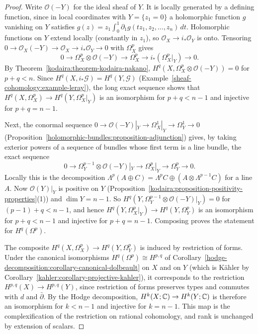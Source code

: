 \begin{proof}
Write $\mathcal{O}(-Y)$ for the ideal sheaf of $Y$. It is locally generated by a defining function, since in local coordinates with
$Y = \{z_1 = 0\}$ a holomorphic function $g$ vanishing on $Y$ satisfies $g(z) = z_1\int_0^1\partial_1g(tz_1, z_2, \ldots, z_n)\,dt$. Holomorphic
functions on $Y$ extend locally (constantly in $z_1$), so $\mathcal{O}_X \to i_*\mathcal{O}_Y$ is onto. Tensoring $0 \to \mathcal{O}_X(-Y) \to \mathcal{O}_X \to i_*\mathcal{O}_Y \to 0$ with $\Omega^p_X$ gives
\[
0 \to \Omega^p_X \otimes \mathcal{O}(-Y) \to \Omega^p_X \to i_*(\Omega^p_X|_Y) \to 0 .
\]
By Theorem~\ref{kodaira:theorem-kodaira-nakano}, $H^q(X, \Omega^p_X \otimes \mathcal{O}(-Y)) = 0$ for $p + q < n$. Since
$H^q(X, i_*\mathcal{G}) = H^q(Y, \mathcal{G})$ (Example~\ref{sheaf-cohomology:example-leray}), the long exact sequence shows that
$H^q(X, \Omega^p_X) \to H^q(Y, \Omega^p_X|_Y)$ is an isomorphism for $p + q < n - 1$ and injective for $p + q = n - 1$.

Next, the conormal sequence $0 \to \mathcal{O}(-Y)|_Y \to \Omega^1_X|_Y \to \Omega^1_Y \to 0$
(Proposition~\ref{holomorphic-bundles:proposition-adjunction}) gives, by taking exterior powers of a sequence of bundles whose first term is a
line bundle, the exact sequence
\[
0 \to \Omega^{p-1}_Y \otimes \mathcal{O}(-Y)|_Y \to \Omega^p_X|_Y \to \Omega^p_Y \to 0 .
\]
Locally this is the decomposition $\Lambda^p(A \oplus C) = \Lambda^p C \oplus (A \otimes \Lambda^{p-1}C)$ for a line $A$. Now $\mathcal{O}(Y)|_Y$ is
positive on $Y$ (Proposition~\ref{kodaira:proposition-positivity-properties}(1)) and $\dim Y = n - 1$. So
$H^q(Y, \Omega^{p-1}_Y \otimes \mathcal{O}(-Y)|_Y) = 0$ for $(p - 1) + q < n - 1$, and hence
$H^q(Y, \Omega^p_X|_Y) \to H^q(Y, \Omega^p_Y)$ is an isomorphism for $p + q < n - 1$ and injective for $p + q = n - 1$. Composing proves the
statement for $H^q(\Omega^p)$.

The composite $H^q(X, \Omega^p_X) \to H^q(Y, \Omega^p_Y)$ is induced by restriction of forms. Under the canonical isomorphisms
$H^q(\Omega^p) \cong H^{p,q}$ of Corollary~\ref{hodge-decomposition:corollary-canonical-dolbeault} on $X$ and on $Y$ (which is K\"ahler by
Corollary~\ref{kahler:corollary-projective-kahler}), it corresponds to the restriction $H^{p,q}(X) \to H^{p,q}(Y)$, since restriction of forms
preserves types and commutes with $d$ and $\bar\partial$. By the Hodge decomposition, $H^k(X; \mathbb{C}) \to H^k(Y; \mathbb{C})$ is therefore an isomorphism
for $k < n - 1$ and injective for $k = n - 1$. This map is the complexification of the restriction on rational cohomology, and rank is
unchanged by extension of scalars.
\end{proof}

